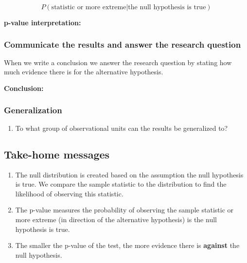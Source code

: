 \documentclass[
]{report}
\providecommand{\tightlist}{%
  \setlength{\itemsep}{0pt}\setlength{\parskip}{0pt}}
\begin{document}
\[P(\text{statistic or more extreme|the null hypothesis is true})\]

\textbf{p-value interpretation:}

\vspace{1in}

\subsubsection*{Communicate the results and answer the research question}\label{communicate-the-results-and-answer-the-research-question}

When we write a conclusion we answer the research question by stating how much evidence there is for the alternative hypothesis.

\textbf{Conclusion:}

\vspace{1in}

\subsubsection*{Generalization}\label{generalization}

\begin{enumerate}
\def\labelenumi{\arabic{enumi}.}
\setcounter{enumi}{7}
\tightlist
\item
  To what group of observational units can the results be generalized to?
\end{enumerate}

\vspace{0.5in}

\subsection{Take-home messages}\label{take-home-messages-4}

\begin{enumerate}
\def\labelenumi{\arabic{enumi}.}
\item
  The null distribution is created based on the assumption the null hypothesis is true. We compare the sample statistic to the distribution to find the likelihood of observing this statistic.
\item
  The p-value measures the probability of observing the sample statistic or more extreme (in direction of the alternative hypothesis) is the null hypothesis is true.
\item
  The smaller the p-value of the test, the more evidence there is \textbf{against} the null hypothesis.
\end{enumerate}
\end{document}
